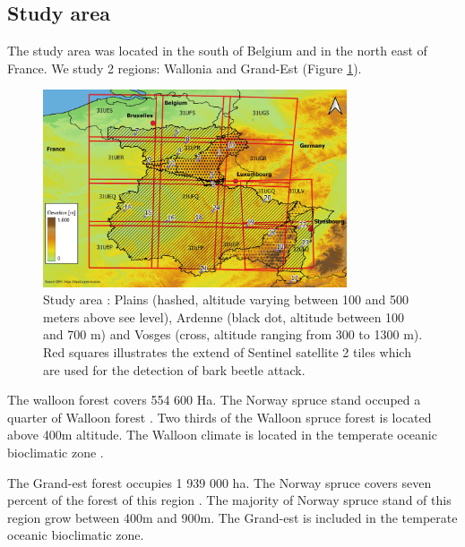 \documentclass[3p,procedia]{elsarticle}
\begin{document}
\subsection{Study area}
The study area was located in the south of Belgium and in the north east of France. We study 2 regions: Wallonia and Grand-Est (Figure \ref{fig:situ}).
\begin{figure} [htbp] 
	\centering
	\includegraphics[width=0.8\textwidth]{gde.jpeg}
	\caption{Study area : Plains (hashed, altitude varying between 100 and 500 meters above see level), Ardenne (black dot, altitude between 100 and 700 m) and Vosges (cross, altitude ranging from 300 to 1300 m). Red squares illustrates the extend of Sentinel satellite 2 tiles which are used for the detection of bark beetle attack.}
	\label{fig:situ}
\end{figure}

The walloon forest covers 554 600 Ha. 
The Norway spruce stand occuped a quarter of Walloon forest \citep{Alderweireld_2015}. 
Two thirds of the Walloon spruce forest is located above 400m altitude. 
The Walloon climate is located in the temperate oceanic bioclimatic zone \citep{lindner_climate_2010}. 

The Grand-est forest occupies 1 939 000 ha. 
The Norway spruce covers seven percent of the forest of this region  \citep{IGN2022}. 
The majority of Norway spruce stand of this region grow between 400m and 900m. 
The Grand-est is included in the temperate oceanic bioclimatic zone\citep{lindner_climate_2010}. 
\end{document}
